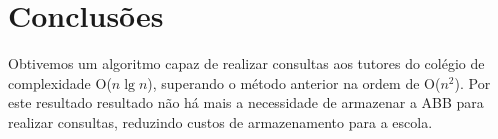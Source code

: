 \section{Conclusões}
\label{sec:conc}
Obtivemos um algoritmo capaz de realizar consultas aos tutores do colégio de
complexidade O($n \lg n$), superando o método anterior na ordem de O($n^2$).
Por este resultado resultado não há mais a necessidade de armazenar a ABB para
realizar consultas, reduzindo custos de armazenamento para a escola.